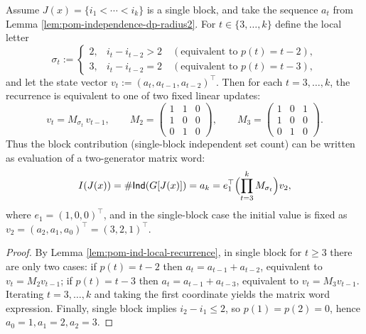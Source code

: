 \begin{proposition}\label{prop:pom-ind-matrix-grammar}
Assume $J(x)=\{i_1<\cdots<i_k\}$ is a single block, and take the sequence $a_t$ from Lemma \ref{lem:pom-independence-dp-radius2}.
For $t\in\{3,\dots,k\}$ define the local letter
\[
\sigma_t:=
\begin{cases}
2,& i_t-i_{t-2}>2\quad(\text{equivalent to }p(t)=t-2),\\
3,& i_t-i_{t-2}=2\quad(\text{equivalent to }p(t)=t-3),
\end{cases}
\]
and let the state vector
\(
v_t:=(a_t,a_{t-1},a_{t-2})^\top
\).
Then for each $t=3,\dots,k$, the recurrence is equivalent to one of two fixed linear updates:
\[
v_t=M_{\sigma_t}\,v_{t-1},
\qquad
M_2=
\begin{pmatrix}
1&1&0\\
1&0&0\\
0&1&0
\end{pmatrix},
\qquad
M_3=
\begin{pmatrix}
1&0&1\\
1&0&0\\
0&1&0
\end{pmatrix}.
\]
Thus the block contribution (single-block independent set count) can be written as evaluation of a two-generator matrix word:
\[
I(J(x))=\#\mathsf{Ind}(G[J(x)])=a_k
=e_1^\top\Bigl(\prod_{t=3}^k M_{\sigma_t}\Bigr)v_2,
\]
where $e_1=(1,0,0)^\top$, and in the single-block case the initial value is fixed as
\(
v_2=(a_2,a_1,a_0)^\top=(3,2,1)^\top
\).
\end{proposition}
\begin{proof}
By Lemma \ref{lem:pom-ind-local-recurrence}, in single block for $t\ge 3$ there are only two cases:
if $p(t)=t-2$ then $a_t=a_{t-1}+a_{t-2}$, equivalent to $v_t=M_2v_{t-1}$;
if $p(t)=t-3$ then $a_t=a_{t-1}+a_{t-3}$, equivalent to $v_t=M_3v_{t-1}$.
Iterating $t=3,\dots,k$ and taking the first coordinate yields the matrix word expression.
Finally, single block implies $i_2-i_1\le 2$, so $p(1)=p(2)=0$, hence $a_0=1,a_1=2,a_2=3$.
\end{proof}

